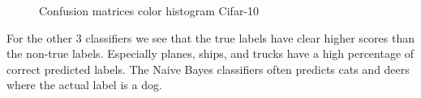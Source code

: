 \documentclass[11pt]{article}
\begin{document}
\begin{figure}
\hfill
\caption{Confusion matrices color histogram Cifar-10}
\label{CV_Matrices_Cifar_color_hist}
\end{figure}

For the other 3 classifiers we see that the true labels have clear higher scores than the non-true labels. Especially planes, ships, and trucks have a high percentage of correct predicted labels. The Naive Bayes classifiers often predicts cats and deers where the actual label is a dog.  
\end{document}
